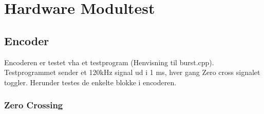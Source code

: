 \section{Hardware Modultest}

\subsection{Encoder}
Encoderen er testet vha et testprogram (Henvisning til burst.cpp). Testprogrammet sender et 120kHz signal ud i 1 ms, hver gang Zero cross signalet toggler. Herunder testes de enkelte blokke i encoderen.    

\subsubsection{Zero Crossing}


